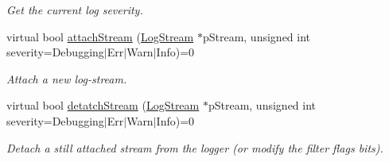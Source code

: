 \begin{CompactItemize}
\begin{CompactList}\small\item\em Get the current log severity. \item\end{CompactList}\item 
virtual bool \hyperlink{class_assimp_1_1_logger_af32a42b02a7e227076013d01e349871}{attachStream} (\hyperlink{class_assimp_1_1_log_stream}{LogStream} $\ast$pStream, unsigned int severity=Debugging$|$Err$|$Warn$|$Info)=0
\begin{CompactList}\small\item\em Attach a new log-stream. \item\end{CompactList}\item 
virtual bool \hyperlink{class_assimp_1_1_logger_9489263727f29fecbd705d5c8d2590c0}{detatchStream} (\hyperlink{class_assimp_1_1_log_stream}{LogStream} $\ast$pStream, unsigned int severity=Debugging$|$Err$|$Warn$|$Info)=0
\begin{CompactList}\small\item\em Detach a still attached stream from the logger (or modify the filter flags bits). \item\end{CompactList}\end{CompactItemize}
